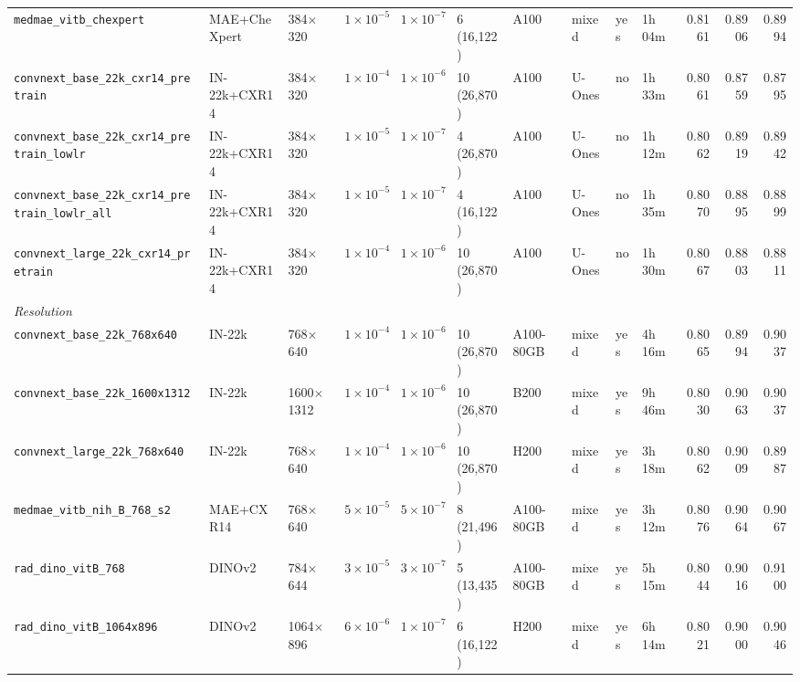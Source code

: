 \begin{landscape}
\begin{longtable}{llllllllllrrr}
    \texttt{\scriptsize medmae\_vitb\_chexpert} & MAE+CheXpert & 384$\times$320 & $1\times10^{-5}$ & $1\times10^{-7}$ & 6 (16,122) & A100 & mixed & yes & 1h\,04m & 0.8161 & 0.8906 & 0.8994 \\
    \texttt{\scriptsize convnext\_base\_22k\_cxr14\_pretrain} & IN-22k+CXR14 & 384$\times$320 & $1\times10^{-4}$ & $1\times10^{-6}$ & 10 (26,870) & A100 & U-Ones & no & 1h\,33m & 0.8061 & 0.8759 & 0.8795 \\
    \texttt{\scriptsize convnext\_base\_22k\_cxr14\_pretrain\_lowlr} & IN-22k+CXR14 & 384$\times$320 & $1\times10^{-5}$ & $1\times10^{-7}$ & 4 (26,870) & A100 & U-Ones & no & 1h\,12m & 0.8062 & 0.8919 & 0.8942 \\
    \texttt{\scriptsize convnext\_base\_22k\_cxr14\_pretrain\_lowlr\_all} & IN-22k+CXR14 & 384$\times$320 & $1\times10^{-5}$ & $1\times10^{-7}$ & 4 (16,122) & A100 & U-Ones & no & 1h\,35m & 0.8070 & 0.8895 & 0.8899 \\
    \texttt{\scriptsize convnext\_large\_22k\_cxr14\_pretrain} & IN-22k+CXR14 & 384$\times$320 & $1\times10^{-4}$ & $1\times10^{-6}$ & 10 (26,870) & A100 & U-Ones & no & 1h\,30m & 0.8067 & 0.8803 & 0.8811 \\
    \midrule
    \multicolumn{13}{l}{\textit{Resolution}} \\
    \texttt{\scriptsize convnext\_base\_22k\_768x640} & IN-22k & 768$\times$640 & $1\times10^{-4}$ & $1\times10^{-6}$ & 10 (26,870) & A100-80GB & mixed & yes & 4h\,16m & 0.8065 & 0.8994 & 0.9037 \\
    \texttt{\scriptsize convnext\_base\_22k\_1600x1312} & IN-22k & 1600$\times$1312 & $1\times10^{-4}$ & $1\times10^{-6}$ & 10 (26,870) & B200 & mixed & yes & 9h\,46m & 0.8030 & 0.9063 & 0.9037 \\
    \texttt{\scriptsize convnext\_large\_22k\_768x640} & IN-22k & 768$\times$640 & $1\times10^{-4}$ & $1\times10^{-6}$ & 10 (26,870) & H200 & mixed & yes & 3h\,18m & 0.8062 & 0.9009 & 0.8987 \\
    \texttt{\scriptsize medmae\_vitb\_nih\_B\_768\_s2} & MAE+CXR14 & 768$\times$640 & $5\times10^{-5}$ & $5\times10^{-7}$ & 8 (21,496) & A100-80GB & mixed & yes & 3h\,12m & 0.8076 & 0.9064 & 0.9067 \\
    \texttt{\scriptsize rad\_dino\_vitB\_768} & DINOv2 & 784$\times$644 & $3\times10^{-5}$ & $3\times10^{-7}$ & 5 (13,435) & A100-80GB & mixed & yes & 5h\,15m & 0.8044 & 0.9016 & 0.9100 \\
    \texttt{\scriptsize rad\_dino\_vitB\_1064x896} & DINOv2 & 1064$\times$896 & $6\times10^{-6}$ & $1\times10^{-7}$ & 6 (16,122) & H200 & mixed & yes & 6h\,14m & 0.8021 & 0.9000 & 0.9046 \\

\end{longtable}
\end{landscape}
